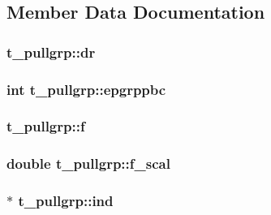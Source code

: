 \subsection{\-Member \-Data \-Documentation}
\hypertarget{structt__pullgrp_a9883622f53036d71b79376d7524bf72d}{
\subsubsection[{dr}]{ {\bf t\-\_\-pullgrp\-::dr}}}\label{structt__pullgrp_a9883622f53036d71b79376d7524bf72d}
\hypertarget{structt__pullgrp_a1e3d498d59eb25dbcf47c894c496e344}{
\subsubsection[{epgrppbc}]{\setlength{\rightskip}{0pt plus 5cm}int {\bf t\-\_\-pullgrp\-::epgrppbc}}}\label{structt__pullgrp_a1e3d498d59eb25dbcf47c894c496e344}
\hypertarget{structt__pullgrp_a218501bc2a219b7aff2bac6731427b4a}{
\subsubsection[{f}]{ {\bf t\-\_\-pullgrp\-::f}}}\label{structt__pullgrp_a218501bc2a219b7aff2bac6731427b4a}
\hypertarget{structt__pullgrp_ac642ce91b5a4837fe4dd9bba9bb2144e}{
\subsubsection[{f\-\_\-scal}]{\setlength{\rightskip}{0pt plus 5cm}double {\bf t\-\_\-pullgrp\-::f\-\_\-scal}}}\label{structt__pullgrp_ac642ce91b5a4837fe4dd9bba9bb2144e}
\hypertarget{structt__pullgrp_a729df7f2f18f169e6ce9315188f6efbb}{
\subsubsection[{ind}]{ $\ast$ {\bf t\-\_\-pullgrp\-::ind}}}\label{structt__pullgrp_a729df7f2f18f169e6ce9315188f6efbb}
